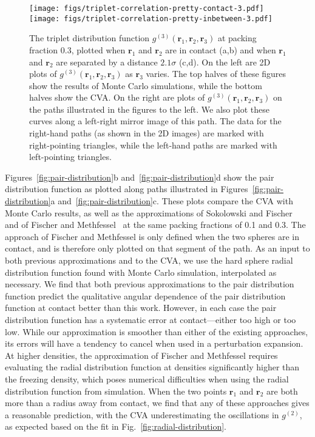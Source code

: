 \documentclass[letterpaper,twocolumn,amsmath,amssymb,pre,aps,10pt]{revtex4-1}
\newcommand{\rr}{\textbf{r}}
\begin{document}
\begin{figure*}
  \texttt{[image: figs/triplet-correlation-pretty-contact-3.pdf]}
  \vspace{-0.7cm}
\\
  \texttt{[image: figs/triplet-correlation-pretty-inbetween-3.pdf]}
  \vspace{-0.7cm}
  \caption{The triplet distribution function
    $g^{(3)}(\rr_1,\rr_2,\rr_3)$ at packing fraction 0.3, plotted when
    $\rr_1$ and $\rr_2$ are in contact (a,b) and when $\rr_1$ and
    $\rr_2$ are separated by a distance $2.1\sigma$ (c,d). On the left
    are 2D plots of $g^{(3)}(\rr_1,\rr_2,\rr_3)$ as $\rr_3$
    varies. %
%
    The top halves of these figures show the results of Monte Carlo
    simulations, while the bottom halves show the CVA.  On the right
    are plots of $g^{(3)}(\rr_1,\rr_2,\rr_3)$ on the paths illustrated
    in the figures to the left.
%
    We also plot these curves along a left-right mirror image of this
    path.  The data for the right-hand paths (as shown in the 2D
    images) are marked with right-pointing triangles, while the
    left-hand paths are marked with left-pointing triangles.
%
  }
  \label{fig:triplet-contact-distribution}
\end{figure*}

Figures~\ref{fig:pair-distribution}b and~\ref{fig:pair-distribution}d
show the pair distribution function as plotted along paths illustrated
in Figures~\ref{fig:pair-distribution}a
and~\ref{fig:pair-distribution}c.  These plots compare the CVA with
Monte Carlo results, as well as the approximations of Sokolowski and
Fischer~\cite{sokolowski1992role} and of Fischer and
Methfessel~\cite{fischer1980born} at the same packing fractions of 0.1
and 0.3.  The approach of Fischer and Methfessel is only defined when
the two spheres are in contact, and is therefore only plotted on that
segment of the path.  As an input to both previous approximations and
to the CVA, we use the hard sphere radial distribution function found
with Monte Carlo simulation, interpolated as necessary. We find that
both previous approximations to the pair distribution function predict
the qualitative angular dependence of the pair distribution function
at contact better than this work.  However, in each case the pair
distribution function has a systematic error at contact---either too
high or too low.  While our approximation is smoother than either of
the existing approaches, its errors will have a tendency to cancel
when used in a perturbation expansion.  At higher densities, the
approximation of Fischer and Methfessel requires evaluating the radial
distribution function at densities significantly higher than the
freezing density, which poses numerical difficulties when using the
radial distribution function from simulation.  When the two points
$\rr_1$ and $\rr_2$ are both more than a radius away from contact, we
find that any of these approaches gives a reasonable prediction, with
the CVA underestimating the oscillations in $g^{(2)}$, as
expected based on the fit in Fig.~\ref{fig:radial-distribution}.
\end{document}
